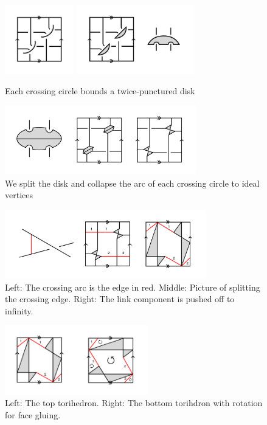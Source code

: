 \documentclass[11pt]{amsart}
\theoremstyle{plain}
\theoremstyle{definition}
\begin{document}
\begin{figure}[h] 
\centering
\includegraphics[height=3cm]{fig-3}
\includegraphics[height=3cm]{fig-4}
	\caption{Each crossing circle bounds a twice-punctured disk}
	\label{fig:step_one}
\end{figure}
 
\begin{figure}[h] 
\centering 
\includegraphics[height=3cm]{fig-5} 
	\caption{We split the disk and collapse the arc of each
 crossing circle to ideal vertices}
	\label{fig:step_two}
\end{figure}


\begin{figure}[h] 
\centering 
\includegraphics[height=3cm]{fig-6} 
\caption{Left: The crossing arc is the edge in red.
Middle: Picture of splitting the crossing edge. Right: The link component is
pushed off to infinity.}
	\label{fig:step_three}
\end{figure}

\begin{figure}[h] 
\centering 
\includegraphics[height=3cm]{top-bottom} 
	\caption{Left: The top torihedron. Right: The bottom torihdron with rotation for face gluing.} 
\label{fig:top-bottom}
\end{figure}
\end{document}
